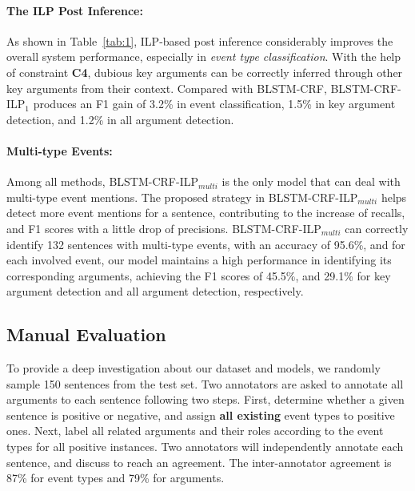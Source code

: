 \paragraph{The ILP Post Inference:}
As shown in Table~\ref{tab:1}, ILP-based post inference considerably improves the overall system performance, especially in \textit{event type classification}. With the help of constraint \textbf{C4},  dubious key arguments can be correctly inferred through other key arguments from their context. Compared with BLSTM-CRF, BLSTM-CRF-ILP$_1$ produces an F1 gain of 3.2\% in event classification, 1.5\% in key argument detection, and 1.2\% in all argument detection. %

\paragraph{Multi-type Events:}
Among all methods, BLSTM-CRF-ILP$_{multi}$ is the only model that can deal with multi-type event mentions. %
The proposed strategy in BLSTM-CRF-ILP$_{multi}$ helps detect more event mentions for a sentence, contributing to the increase of recalls, and F1 scores with a little drop of precisions.
BLSTM-CRF-ILP$_{multi}$ can correctly identify 132 sentences with multi-type events,
with an accuracy of 95.6\%, and for each involved event, our model maintains a high
performance in identifying its corresponding arguments, achieving the F1 scores of 45.5\%, and 29.1\% for key argument detection and all argument detection, respectively.

\subsection{Manual Evaluation}\label{manualeve}
To provide a deep investigation about our dataset and models, we randomly sample 150 sentences
from the test set. Two annotators are asked to annotate all arguments to each sentence following
two steps. First, determine whether a given sentence is positive or negative, and assign \textbf{all existing}
event types to positive ones. Next, label all related arguments and their roles according to
the event types for all positive instances. Two annotators will independently annotate each sentence,
and discuss to reach an agreement. The inter-annotator agreement is 87\% for event types and 79\% for arguments.


